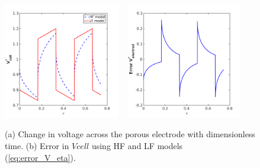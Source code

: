 \documentclass[]{article}
\begin{document}
\begin{figure}[t]
    \centering
    \includegraphics[trim = 0in 0in 0in 0in, clip, width=0.45\textwidth]{figures/cyclic_new/Vcell_t.png}   
    ~
    \includegraphics[trim = 0in 0in 0in 0in, clip, width=0.45\textwidth]{figures/cyclic_new/Error_V.png}           
    \caption{(a) Change in voltage across the porous electrode with dimensionless time.
    (b) Error in $Vcell$ using HF and LF models (\ref{eq:error_V_eta}).}
    \label{fig:Vcell_cycl}
\end{figure}







\clearpage

%
\end{document}
